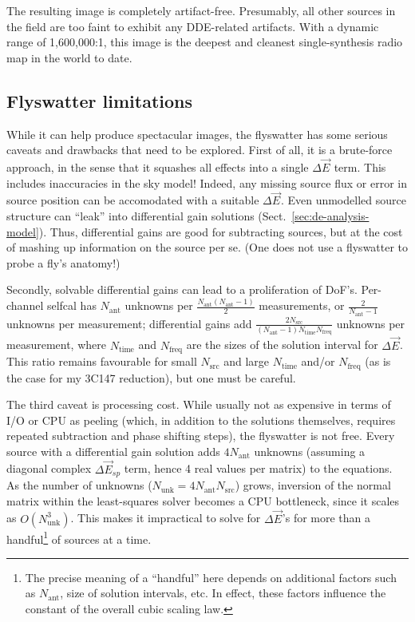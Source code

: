 \documentclass[]{aa}
\newcommand{\jones}[2]{\vec {#1}_{#2}}
\begin{document}
The resulting image is completely artifact-free. Presumably, all other sources in the field are too faint to exhibit any DDE-related artifacts. With a dynamic range of 1,600,000:1, this image is the deepest and cleanest single-synthesis radio map in the world to date. 

\subsection{Flyswatter limitations\label{sec:dE-limitations}}

While it can help produce spectacular images, the flyswatter has some serious caveats and drawbacks that need to be explored. First of all, it is a brute-force approach, in the sense that it squashes all effects into a single $\Delta\jones{E}{}$ term. This includes inaccuracies in the sky model! Indeed, any missing source flux or error in source position can be accomodated with a suitable $\Delta\jones{E}{}$. Even unmodelled source structure can ``leak'' into differential gain solutions (Sect.~\ref{sec:de-analysis-model}). Thus, differential gains are good for subtracting sources, but at the cost of mashing up information on the source per se. (One does not use a flyswatter to probe a fly's anatomy!)

Secondly, solvable differential gains can lead to a proliferation of DoF's. Per-channel selfcal has $N_\mathrm{ant}$ unknowns per $\frac{N_\mathrm{ant}(N_\mathrm{ant}-1)}{2}$ measurements, or $\frac{2}{N_\mathrm{ant}-1}$ unknowns per measurement; differential gains add $\frac{2N_\mathrm{src}}{(N_\mathrm{ant}-1)N_\mathrm{time}N_\mathrm{freq}}$ unknowns per measurement, where $N_\mathrm{time}$ and $N_\mathrm{freq}$ are the sizes of the solution interval for $\Delta\jones{E}{}$. This ratio remains favourable for small $N_\mathrm{src}$ and large $N_\mathrm{time}$ and/or $N_\mathrm{freq}$ (as is the case for my 3C147 reduction), but one must be careful.

The third caveat is processing cost. While usually not as expensive in terms of I/O or CPU as peeling (which, in addition to the solutions themselves, requires repeated subtraction and phase shifting steps), the flyswatter is not free. Every source with a differential gain solution adds $4N_\mathrm{ant}$ unknowns (assuming a diagonal complex $\Delta\jones{E}{sp}$ term, hence 4 real values per matrix) to the equations. As the number of unknowns ($N_\mathrm{unk}=4N_\mathrm{ant}N_\mathrm{src}$) grows, inversion of the normal matrix within the least-squares solver becomes a CPU bottleneck, since it scales as $O(N_\mathrm{unk}^3)$. This makes it impractical to solve for $\Delta\jones{E}{}$'s for more than a handful\footnote{The precise meaning of a ``handful'' here depends on additional factors such as $N_\mathrm{ant}$, size of solution intervals, etc. In effect, these factors influence the constant of the overall cubic scaling law.} of sources at a time. 
\end{document}
